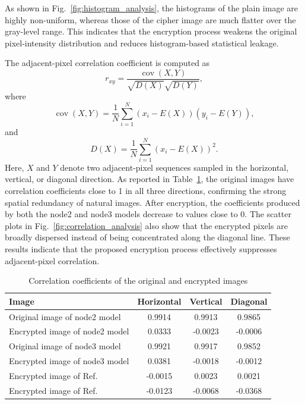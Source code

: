 \documentclass[a4paper,fleqn]{cas-dc}
\theoremstyle{plain}
\theoremstyle{definition}
\begin{document}
As shown in Fig.~\ref{fig:histogram_analysis}, the histograms of the plain image are highly non-uniform, whereas those of the cipher image are much flatter over the gray-level range. This indicates that the encryption process weakens the original pixel-intensity distribution and reduces histogram-based statistical leakage.

The adjacent-pixel correlation coefficient is computed as
\begin{equation}
	r_{xy} = \frac{\operatorname{cov}(X,Y)} {\sqrt{D(X)}\sqrt{D(Y)}},
\end{equation}
where
\begin{equation}
	\operatorname{cov}(X,Y) = \frac{1}{N} \sum_{i=1}^{N} (x_i-E(X))(y_i-E(Y)),
\end{equation}
and
\begin{equation}
	D(X)= \frac{1}{N} \sum_{i=1}^{N} (x_i-E(X))^2.
\end{equation}
Here, \(X\) and \(Y\) denote two adjacent-pixel sequences sampled in the horizontal, vertical, or diagonal direction. As reported in Table~\ref{tab:correlation_index}, the original images have correlation coefficients close to 1 in all three directions, confirming the strong spatial redundancy of natural images. After encryption, the coefficients produced by both the node2 and node3 models decrease to values close to 0. The scatter plots in Fig.~\ref{fig:correlation_analysis} also show that the encrypted pixels are broadly dispersed instead of being concentrated along the diagonal line. These results indicate that the proposed encryption process effectively suppresses adjacent-pixel correlation.

\begin{table}[t]
	\centering
	\caption{Correlation coefficients of the original and encrypted images}
	\label{tab:correlation_index}
		\begin{tabular}{lccc}
			\toprule
			\textbf{Image} & \textbf{Horizontal} & \textbf{Vertical} & \textbf{Diagonal} \\
			\midrule
			Original image of node2 model & 0.9914 & 0.9913 & 0.9865 \\
			Encrypted image of node2 model & 0.0333 & -0.0023 & -0.0006 \\
			Original image of node3 model & 0.9921 & 0.9917 & 0.9852 \\
			Encrypted image of node3 model & 0.0381 & -0.0018 & -0.0012 \\
			Encrypted image of Ref.~\cite{li2024novel} & -0.0015 & 0.0023 & 0.0021 \\
			Encrypted image of Ref.~\cite{verma2025quantum} & -0.0123 & -0.0068 & -0.0368 \\
			\bottomrule
		\end{tabular}
\end{table}
\end{document}
